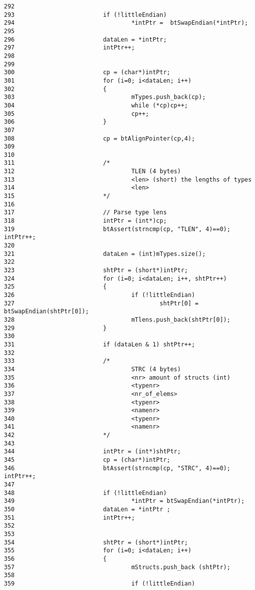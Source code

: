 \begin{Code}
\begin{verbatim}
292 
293                         if (!littleEndian)
294                                 *intPtr =  btSwapEndian(*intPtr);
295 
296                         dataLen = *intPtr;
297                         intPtr++;
298 
299 
300                         cp = (char*)intPtr;
301                         for (i=0; i<dataLen; i++)
302                         {
303                                 mTypes.push_back(cp);
304                                 while (*cp)cp++;
305                                 cp++;
306                         }
307 
308                         cp = btAlignPointer(cp,4);
309 
310 
311                         /*
312                                 TLEN (4 bytes)
313                                 <len> (short) the lengths of types
314                                 <len>
315                         */
316 
317                         // Parse type lens
318                         intPtr = (int*)cp;
319                         btAssert(strncmp(cp, "TLEN", 4)==0); intPtr++;
320 
321                         dataLen = (int)mTypes.size();
322 
323                         shtPtr = (short*)intPtr;
324                         for (i=0; i<dataLen; i++, shtPtr++)
325                         {
326                                 if (!littleEndian)
327                                         shtPtr[0] = btSwapEndian(shtPtr[0]);
328                                 mTlens.push_back(shtPtr[0]);
329                         }
330 
331                         if (dataLen & 1) shtPtr++;
332 
333                         /*
334                                 STRC (4 bytes)
335                                 <nr> amount of structs (int)
336                                 <typenr>
337                                 <nr_of_elems>
338                                 <typenr>
339                                 <namenr>
340                                 <typenr>
341                                 <namenr>
342                         */
343 
344                         intPtr = (int*)shtPtr;
345                         cp = (char*)intPtr;
346                         btAssert(strncmp(cp, "STRC", 4)==0); intPtr++;
347 
348                         if (!littleEndian)
349                                 *intPtr = btSwapEndian(*intPtr);
350                         dataLen = *intPtr ;
351                         intPtr++;
352 
353 
354                         shtPtr = (short*)intPtr;
355                         for (i=0; i<dataLen; i++)
356                         {
357                                 mStructs.push_back (shtPtr);
358 
359                                 if (!littleEndian)

\end{verbatim}
\end{Code}
